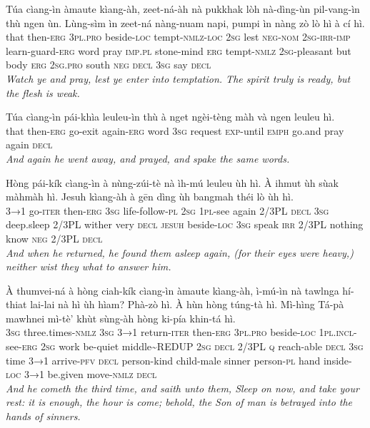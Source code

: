 \documentclass[11pt,a4paper]{article}
\begin{document}
\begin{exe}
\gll Túa cìang-ìn àmaute kìang-àh, zeet-ná-àh nà pukkhak lòh nà-dìng-ùn pil-vang-ìn thù ngen ùn. Lùng-sìm ìn zeet-ná nàng-nuam napi, pumpi ìn nàng zò lò hì à cí hì. \\
     that then-\textsc{erg} \textsc{3pl}.\textsc{pro} beside-\textsc{loc} tempt-\textsc{nmlz}-\textsc{loc} \textsc{2sg} lest \textsc{neg}-\textsc{nom} \textsc{2sg}-\textsc{irr}-\textsc{imp} learn-guard-\textsc{erg} word pray \textsc{imp}.\textsc{pl} stone-mind \textsc{erg} tempt-\textsc{nmlz} \textsc{2sg}-pleasant but body \textsc{erg} \textsc{2sg}.\textsc{pro} south \textsc{neg} \textsc{decl} \textsc{3sg} say \textsc{decl} \\
\glt \textcolor{kjvcolor}{\textit{Watch ye and pray, lest ye enter into temptation. The spirit truly is ready, but the flesh is weak.}}

\gll Túa cìang-ìn pái-khìa leuleu-ìn thù à nget ngèi-tèng màh và ngen leuleu hì. \\
     that then-\textsc{erg} go-exit again-\textsc{erg} word \textsc{3sg} request \textsc{exp}-until \textsc{emph} go.and pray again \textsc{decl} \\
\glt \textcolor{kjvcolor}{\textit{And again he went away, and prayed, and spake the same words.}}

\gll Hòng pái-kík cìang-ìn à nùng-zúi-tè nà ìh-mú leuleu ùh hì. À ihmut ùh sùak màhmàh hì. Jesuh kìang-àh à gēn dìng ùh bangmah théi lò ùh hì. \\
     \textsc{3→1} go-\textsc{iter} then-\textsc{erg} \textsc{3sg} life-follow-\textsc{pl} \textsc{2sg} \textsc{1pl}-see again 2/3PL \textsc{decl} \textsc{3sg} deep.sleep 2/3PL wither very \textsc{decl} \textsc{jesuh} beside-\textsc{loc} \textsc{3sg} speak \textsc{irr} 2/3PL nothing know \textsc{neg} 2/3PL \textsc{decl} \\
\glt \textcolor{kjvcolor}{\textit{And when he returned, he found them asleep again, (for their eyes were heavy,) neither wist they what to answer him.}}

\gll À thumvei-ná à hòng ciah-kík cìang-ìn àmaute kìang-àh, ì-mú-ìn nà tawlnga hí-thiat lai-lai nà hì ùh hìam? Phà-zò hì. À hùn hòng túng-tà hì. Mì-hìng Tá-pà mawhnei mì-tè' khùt sùng-àh hòng ki-pía khin-tá hì. \\
     \textsc{3sg} three.times-\textsc{nmlz} \textsc{3sg} \textsc{3→1} return-\textsc{iter} then-\textsc{erg} \textsc{3pl}.\textsc{pro} beside-\textsc{loc} \textsc{1pl}.\textsc{incl}-see-\textsc{erg} \textsc{2sg} work be-quiet middle\textasciitilde{}REDUP \textsc{2sg} \textsc{decl} 2/3PL \textsc{q} reach-able \textsc{decl} \textsc{3sg} time \textsc{3→1} arrive-\textsc{pfv} \textsc{decl} person-kind child-male sinner person-\textsc{pl} hand inside-\textsc{loc} \textsc{3→1} be.given move-\textsc{nmlz} \textsc{decl} \\
\glt \textcolor{kjvcolor}{\textit{And he cometh the third time, and saith unto them, Sleep on now, and take your rest: it is enough, the hour is come; behold, the Son of man is betrayed into the hands of sinners.}}


\end{exe}
\end{document}
